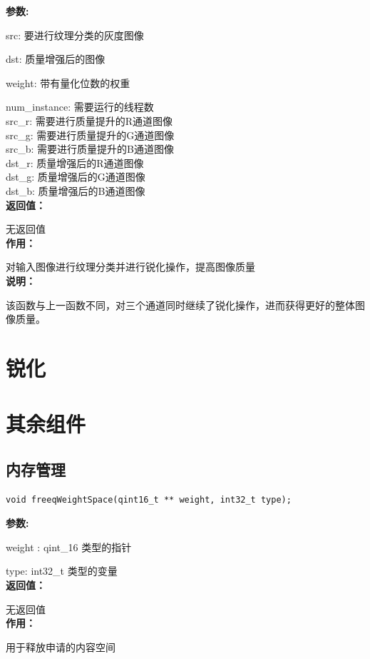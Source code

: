 \documentclass[12pt, a4paper, oneside]{ctexbook}
\begin{document}
\begin{enumerate}
			\textbf{参数:} \par src: 要进行纹理分类的灰度图像 \par dst: 质量增强后的图像\par weight: 带有量化位数的权重\par num\_instance: 需要运行的线程数 \\ src\_r: 需要进行质量提升的R通道图像 \\ src\_g: 需要进行质量提升的G通道图像 \\ src\_b: 需要进行质量提升的B通道图像 \\ dst\_r: 质量增强后的R通道图像 \\ dst\_g: 质量增强后的G通道图像 \\ dst\_b: 质量增强后的B通道图像\\
			\textbf{返回值：}\par 无返回值\\
			\textbf{作用：}\par 对输入图像进行纹理分类并进行锐化操作，提高图像质量\\
			\textbf{说明：}\par 该函数与上一函数不同，对三个通道同时继续了锐化操作，进而获得更好的整体图像质量。

		
	\end{enumerate}
	

		
	\section{锐化}
	\section{其余组件}
		\subsection{内存管理}
		\begin{lstlisting}[numbers=none]
void freeqWeightSpace(qint16_t ** weight, int32_t type);
		\end{lstlisting}
	\textbf{参数:} \par weight : qint\_16 类型的指针 \par type: int32\_t 类型的变量 \\
	\textbf{返回值：}\par 无返回值 \\
	\textbf{作用：}\par 用于释放申请的内容空间\\
	
\end{document}
